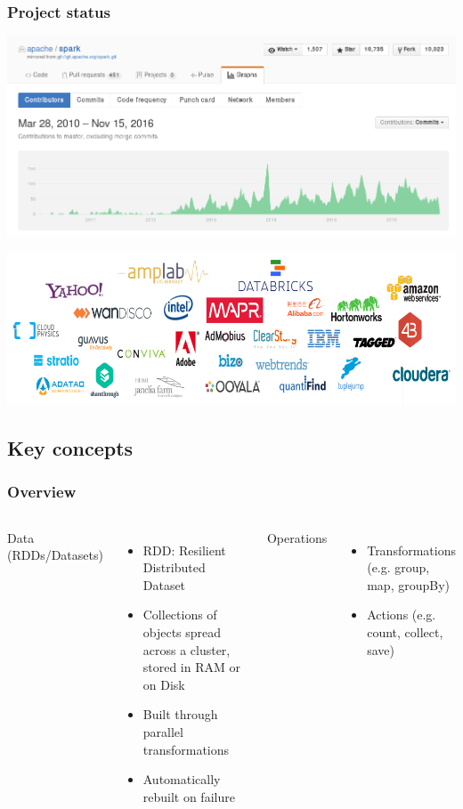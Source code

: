 \documentclass{beamer}
\begin{document}
\begin{frame}
\frametitle{Project status}
\center 

\includegraphics[width=\textwidth]{images/sparkgh.png}

\includegraphics[height=.35\textheight]{images/contributors.png}
\end{frame}

\subsection{Key concepts}

\begin{frame}
\frametitle{Overview}
\begin{columns}[t]
    Data (RDDs/Datasets)
    
    \begin{itemize}
    \item RDD: Resilient Distributed Dataset
    \item Collections of objects spread across a cluster, stored in RAM or on Disk
    \item Built through parallel transformations
    \item Automatically rebuilt on failure
    \end{itemize}
    Operations
    \begin{itemize}
    \item Transformations (e.g. group, map, groupBy)
    \item Actions (e.g. count, collect, save)
    \end{itemize}
\end{columns}
\end{frame}
\end{document}
